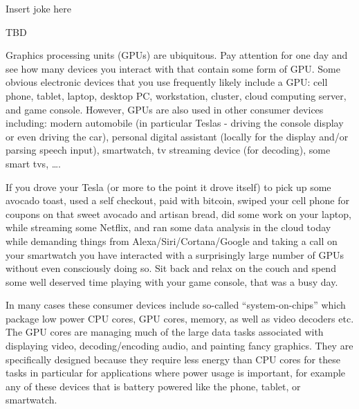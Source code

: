 \epigraph{Insert joke here}{TBD}

\minitoc


Graphics processing units (GPUs) are ubiquitous. Pay attention for one day and see how many devices you interact with that contain some form of GPU. Some obvious electronic devices that you use frequently likely include a GPU: cell phone, tablet, laptop, desktop PC, workstation, cluster, cloud computing server, and game console. However, GPUs are also used in other consumer devices including: modern automobile (in particular Teslas - driving the console display or even driving the car), personal digital assistant (locally for the display and/or parsing speech input), smartwatch, tv streaming device (for decoding), some smart tvs, \ldots. 

If you drove your Tesla (or more to the point it drove itself) to pick up some avocado toast, used a self checkout, paid with bitcoin, swiped your cell phone for coupons on that sweet avocado and artisan bread, did some work on your laptop, while streaming some Netflix, and ran some data analysis in the cloud today while demanding things from Alexa/Siri/Cortana/Google and taking a call on your smartwatch you have interacted with a surprisingly large number of GPUs without even consciously doing so. Sit back and relax on the couch and spend some well deserved time playing with your game console, that was a busy day.

In many cases these consumer devices include so-called ``system-on-chips'' which package low power CPU cores, GPU cores, memory, as well as video decoders etc. The GPU cores are managing much of the large data tasks associated with displaying video, decoding/encoding audio, and painting fancy graphics. They are specifically designed because they require less energy than CPU cores for these tasks in particular for applications where power usage is important, for example any of these devices that is battery powered like the phone, tablet, or smartwatch.

